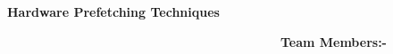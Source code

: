 \documentclass[12pt]{article}
\begin{document}
\vspace{\baselineskip}

\vspace{\baselineskip}

\vspace{\baselineskip}

\vspace{\baselineskip}

\vspace{\baselineskip}

\vspace{\baselineskip}

\vspace{\baselineskip}

\vspace{\baselineskip}

\vspace{\baselineskip}

\vspace{\baselineskip}

\vspace{\baselineskip}

\vspace{\baselineskip}
{\fontsize{32pt}{38.4pt}\selectfont \textbf{Hardware Prefetching Techniques}\par}\par


\vspace{\baselineskip}

\vspace{\baselineskip}

\vspace{\baselineskip}

\vspace{\baselineskip}

\vspace{\baselineskip}

\vspace{\baselineskip}

\vspace{\baselineskip}
{\fontsize{18pt}{21.6pt}\selectfont \textbf{\ \ \ \ \ \ \ \ \ \ \ \ \ \ \ \ \ \ \ \ \ \ \ \ \ \ \ \ \ \ \ \ \ \ \ \ \ \  Team Members:-}\par}\par

{\fontsize{15pt}{18.0pt}\selectfont \textbf{\ \ \ \ \ \ \ \ \ \ \ \ \ \ \ \ \ \ \ \ \ \ \ \ \ \ \ \ \ \ \ \ \ \ \ \ \ \ \ \ \ \ \ \ \ \  }\par}\par
\end{document}
